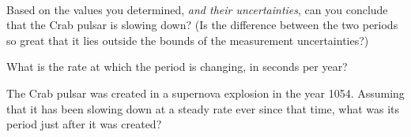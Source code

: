 
\ \ \ 

Based on the values you determined, {\it and their uncertainties},
can you conclude that the Crab
pulsar is slowing down?  (Is the difference between the two periods so great
that it lies outside the bounds of the measurement uncertainties?)

\answerspace{1in}

What is the rate at which the period is changing, in seconds per year?

\answerspace{1in}

The Crab pulsar was created in a supernova explosion in the year 1054.
Assuming that it has been slowing down at a steady rate ever since that
time, what was its period just after it was created?

\answerspace{1in}
